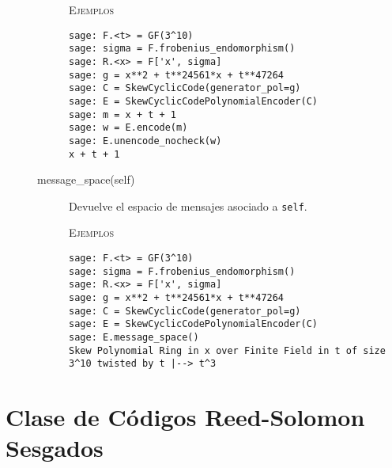 \begin{description}
\begin{description}
        \textsc{Ejemplos}
        \begin{lstlisting}
sage: F.<t> = GF(3^10)
sage: sigma = F.frobenius_endomorphism()
sage: R.<x> = F['x', sigma]
sage: g = x**2 + t**24561*x + t**47264
sage: C = SkewCyclicCode(generator_pol=g)
sage: E = SkewCyclicCodePolynomialEncoder(C)
sage: m = x + t + 1
sage: w = E.encode(m)
sage: E.unencode_nocheck(w)
x + t + 1
        \end{lstlisting}

        \item[message\_space(self)]
        Devuelve el espacio de mensajes asociado a \texttt{self}.

        \textsc{Ejemplos}
        \begin{lstlisting}
sage: F.<t> = GF(3^10)
sage: sigma = F.frobenius_endomorphism()
sage: R.<x> = F['x', sigma]
sage: g = x**2 + t**24561*x + t**47264
sage: C = SkewCyclicCode(generator_pol=g)
sage: E = SkewCyclicCodePolynomialEncoder(C)
sage: E.message_space()
Skew Polynomial Ring in x over Finite Field in t of size 3^10 twisted by t |--> t^3
        \end{lstlisting}
    \end{description}

\end{description}

\section{Clase de Códigos Reed-Solomon Sesgados}

